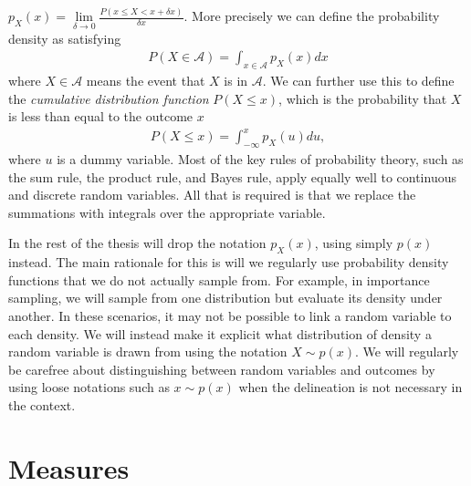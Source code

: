 $p_{X}(x) = \lim\limits_{\delta\rightarrow0} \frac{P(x\le X <x+\delta x)}{\delta x}$.  More 
precisely we can define the probability density as satisfying
\begin{align}
\label{eq:prob:density}
P(X\in \mathcal{A}) = \int_{x\in\mathcal{A}} p_{X}(x) dx
\end{align}
where $X\in \mathcal{A}$ means the event that $X$ is in $\mathcal{A}$.  We can further
use this to define the \emph{cumulative distribution function} $P(X\le x)$, which is the probability
that $X$ is less than equal to the outcome $x$
\begin{align}
\label{eq:prob:cumulative}
P(X\le x) = \int_{-\infty}^{x} p_{X}(u) du,
\end{align}
where $u$ is a dummy variable.
Most of the key rules of probability theory, such as the sum rule, the product rule, and Bayes
rule, apply equally well to continuous and discrete random variables.  All that is required
is that we replace the summations with integrals over the appropriate variable. 

In the rest of the thesis will drop the notation $p_{X}(x)$, using simply $p(x)$ instead.
The main rationale for this is will we regularly use probability density functions that we do
not actually sample from.  For example, in importance sampling, we will sample from one
distribution but evaluate its density under another.  In these scenarios, it may not be possible
to link a random variable to each density.  We will instead make it explicit what distribution
of density a random variable is drawn from using the notation $X\sim p(x)$.  
We will regularly be carefree about
distinguishing between random variables and outcomes by using loose notations such as
$x\sim p(x)$ when the delineation is not necessary in the context.


\section{Measures}
\label{sec:prob:measure}


